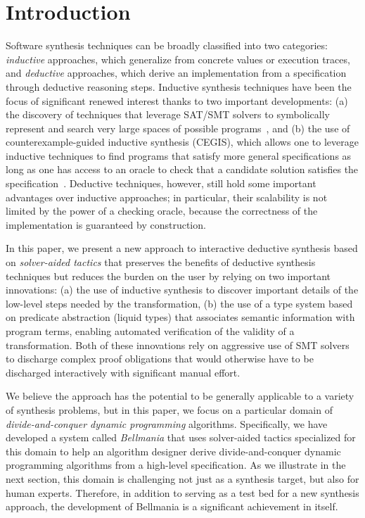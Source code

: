 \section{Introduction}
\label{intro}


\newcommand{\xidx}{i}
\newcommand{\yidx}{j}
\newcommand{\xw}[1]{w^x_{#1}}
\newcommand{\yw}[1]{w^y_{#1}}

Software synthesis techniques can be broadly classified into two categories: \emph{inductive} approaches, which generalize from concrete values or execution traces, and \emph{deductive} approaches, which derive an implementation from a specification through deductive reasoning steps. Inductive synthesis techniques have been the focus of significant renewed interest thanks to two important developments: (a) the discovery of techniques that leverage SAT/SMT solvers to symbolically represent and search very large spaces of possible programs~\cite{APLAS09/Solar-Lezama, PLDI11/Gulwani, Onward13/Torlak}, and (b) the use of counterexample-guided inductive synthesis (CEGIS), which allows one to leverage inductive techniques to find programs that satisfy more general specifications as long as one has access to an oracle to check that a candidate solution satisfies the specification~\cite{APLAS09/Solar-Lezama}. Deductive techniques, however, still hold some important advantages over inductive approaches; in particular, their scalability is not limited by the power of a checking oracle, because the correctness of the implementation is guaranteed by construction.

In this paper, we present a new approach to interactive deductive synthesis based on \emph{solver-aided tactics} that preserves the benefits of deductive synthesis techniques but reduces the burden on the user by relying on two important innovations: (a) the use of inductive synthesis to discover important details of the low-level steps needed by the transformation, (b) the use of a type system based on predicate abstraction (liquid types) that associates semantic information with program terms, enabling automated verification of the validity of a transformation. Both of these innovations rely on aggressive use of SMT solvers to discharge complex proof obligations that would otherwise have to be discharged interactively with significant manual effort. 

We believe the approach has the potential to be generally applicable to a variety of synthesis problems, but in this paper, we focus on a particular domain of \emph{divide-and-conquer dynamic programming} algorithms. Specifically, we have developed a system called \emph{Bellmania} that uses solver-aided tactics specialized for this domain to help an algorithm designer derive divide-and-conquer dynamic programming algorithms from a high-level specification. As we illustrate in the next section, this domain is challenging not just as a synthesis target, but also for human experts. Therefore, in addition to serving as a test bed for a new synthesis approach, the development of Bellmania is a significant achievement in itself.

